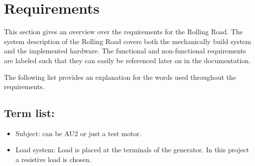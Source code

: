 \chapter{Requirements}
This section gives an overview over the requirements for the Rolling Road. The system description of the Rolling Road covers both the mechanically build system and the implemented hardware. The functional and non-functional requirements are labeled such that they can easily be referenced later on in the documentation.

The following list provides an explanation for the words used throughout the requirements. 
\section{Term list:}
\begin{itemize}
	\item Subject: can be AU2 or just a test motor.
	\item Load system: Load is placed at the terminals of the generator. In this project a resistive load is chosen.
\end{itemize}


